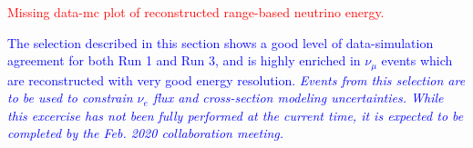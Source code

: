 \textcolor{red}{Missing data-mc plot of reconstructed range-based neutrino energy.}

\textcolor{blue}{The selection described in this section shows a good level of data-simulation agreement for both Run 1 and Run 3, and is highly enriched in $\nu_{\mu}$ events which are reconstructed with very good energy resolution. \emph{Events from this selection are to be used to constrain $\nu_e$ flux and cross-section modeling uncertainties. While this excercise has not been fully performed at the current time, it is expected to be completed by the Feb. 2020 collaboration meeting.}}